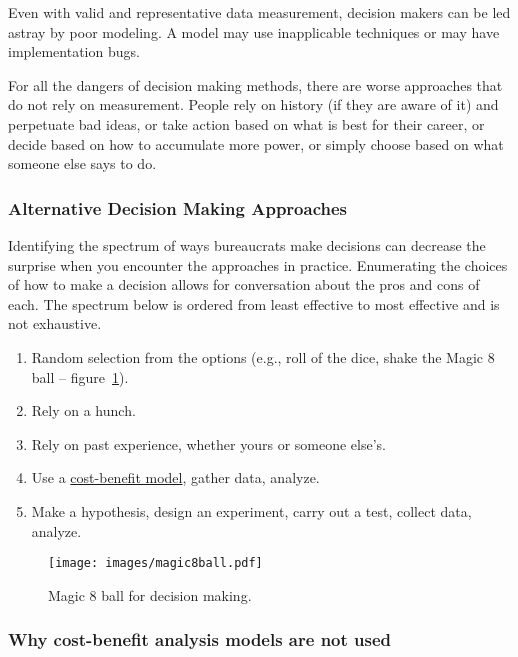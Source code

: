 Even with valid and representative data measurement, decision makers can be led astray by poor modeling. A model may use inapplicable techniques or may have implementation bugs.

For all the dangers of decision making methods, there are worse approaches that do not rely on measurement. People rely on history (if they are aware of it) and perpetuate bad ideas, or take action based on what is best for their career, or decide based on how to accumulate more power, or simply choose based on what someone else says to do.  

\subsubsection{Alternative Decision Making Approaches}
Identifying the spectrum of ways bureaucrats make decisions can decrease the surprise when you encounter the approaches in practice. 
Enumerating the choices of how to make a decision allows for conversation about the pros and cons of each. The spectrum below is ordered from least effective to most effective and is not exhaustive.
\begin{enumerate}
    \item Random selection from the options (e.g., roll of the dice, shake the Magic 8 ball -- figure~\ref{fig:magic8ball}).
    \item Rely on a hunch.
    \item Rely on past experience, whether yours or someone else's.
    \item Use a \href{https://en.wikipedia.org/wiki/Cost\%E2\%80\%93benefit_analysis}{cost-benefit model}, 
    gather data, analyze.
    \item Make a hypothesis, design an experiment, carry out a test, collect data, analyze.
\end{enumerate}

\begin{figure}
    \centering
    \texttt{[image: images/magic8ball.pdf]}
    \caption{Magic 8 ball for decision making.}
    \label{fig:magic8ball}
\end{figure}

\subsubsection{Why cost-benefit analysis models are not used}

